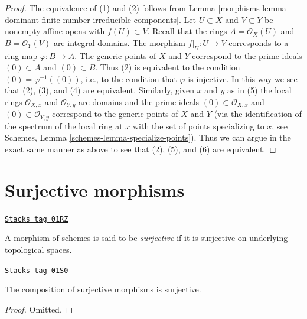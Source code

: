 \begin{proof}

The equivalence of (1) and (2) follows from
Lemma \ref{morphisms-lemma-dominant-finite-number-irreducible-components}.
Let $U \subset X$ and $V \subset Y$ be nonempty affine opens with
$f(U) \subset V$. Recall that the rings $A = \mathcal{O}_X(U)$
and $B = \mathcal{O}_Y(V)$ are integral domains.
The morphism $f|_U : U \to V$ corresponds to a ring map
$\varphi : B \to A$. The generic points of $X$ and $Y$ correspond
to the prime ideals $(0) \subset A$ and $(0) \subset B$. Thus
(2) is equivalent to the condition $(0) = \varphi^{-1}((0))$,
i.e., to the condition that $\varphi$ is injective.
In this way we see that (2), (3), and (4) are equivalent.
Similarly, given $x$ and $y$ as in (5) the local rings
$\mathcal{O}_{X, x}$ and $\mathcal{O}_{Y, y}$ are domains
and the prime ideals $(0) \subset \mathcal{O}_{X, x}$
and $(0) \subset \mathcal{O}_{Y, y}$ correspond to the
generic points of $X$ and $Y$ (via the identification of
the spectrum of the local ring at $x$
with the set of points specializing to $x$, see
Schemes, Lemma \ref{schemes-lemma-specialize-points}).
Thus we can argue in the exact same manner as above
to see that (2), (5), and (6) are equivalent.
\end{proof}

\section{Surjective morphisms}
\label{morphisms-section-surjective}
\begin{definition}[Surjective]
\label{morphisms-definition-surjective}
\href{https://stacks.math.columbia.edu/tag/01RZ}{\texttt{Stacks tag 01RZ}}

A morphism of schemes is said to be {\it surjective}
if it is surjective on underlying topological
spaces.
\end{definition}

\begin{lemma}
\label{morphisms-lemma-composition-surjective}
\href{https://stacks.math.columbia.edu/tag/01S0}{\texttt{Stacks tag 01S0}}

The composition of surjective morphisms is surjective.
\end{lemma}

\begin{proof}
Omitted.
\end{proof}

